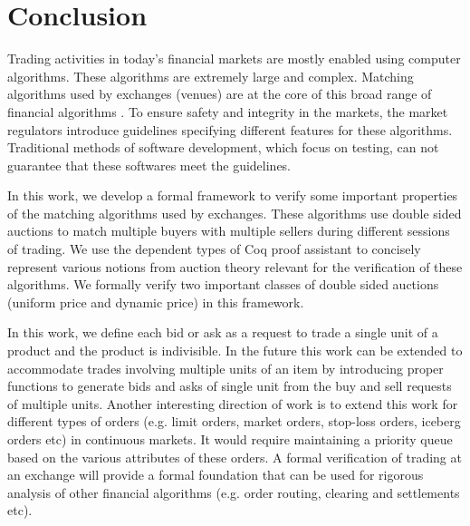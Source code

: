 \documentclass[a4paper,UKenglish,cleveref, autoref]{lipics-v2019}
\begin{document}
\section{Conclusion}\label{sec:conclusion}
Trading activities in today's financial markets are mostly enabled using computer algorithms. These algorithms are extremely large and complex. Matching algorithms used by exchanges (venues) are at the core of this broad range of financial algorithms \cite{PassmoreI17}. To ensure safety and integrity in the markets, the market regulators introduce guidelines specifying different features for these algorithms. Traditional methods of software development, which focus on testing, can not guarantee that these softwares meet the guidelines. 

In this work, we develop a formal framework to verify some important properties of the matching algorithms used by exchanges. These algorithms use double sided auctions to match multiple buyers with multiple sellers during different sessions of trading. We use the dependent types of Coq proof assistant to concisely represent various notions from auction theory relevant for the verification of these algorithms. We formally verify two important classes of double sided auctions (uniform price and dynamic price) in this framework. 

In this work, we define each bid or ask as a request to trade a single unit of a product and the product is indivisible. In the future this work can be extended to accommodate trades involving multiple units of an item by introducing proper functions to generate bids and asks of single unit from the buy and sell requests of multiple units. Another interesting direction of work is to extend this work for different types of orders (e.g. limit orders, market orders, stop-loss orders, iceberg orders etc) in continuous markets. It would require maintaining a priority queue based on the various attributes of these orders. A formal verification of trading at an exchange will provide a formal foundation that can be used for rigorous analysis of other financial algorithms (e.g. order routing, clearing and settlements etc).



\end{document}
